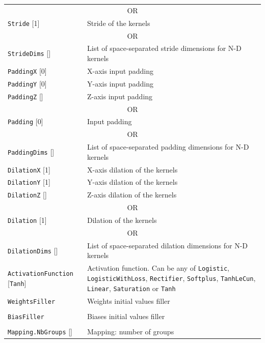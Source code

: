 \documentclass[a4paper,11pt,oneside]{article}
\begin{document}
\begin{center}
\begin{longtable}{| p{5cm} | p{10cm} | }
  \multicolumn{2}{|c|}{\cellcolor{clrgray}\tiny OR} \\
  \lstinline!Stride! [1] & Stride of the kernels \\
  \multicolumn{2}{|c|}{\cellcolor{clrgray}\tiny OR} \\
  \lstinline!StrideDims! [] & List of space-separated stride dimensions for N-D kernels \\
  \hline
  \lstinline!PaddingX! [0] & X-axis input padding \\
  \lstinline!PaddingY! [0] & Y-axis input padding \\
  \lstinline!PaddingZ! [] & Z-axis input padding \\
  \multicolumn{2}{|c|}{\cellcolor{clrgray}\tiny OR} \\
  \lstinline!Padding! [0] & Input padding \\
  \multicolumn{2}{|c|}{\cellcolor{clrgray}\tiny OR} \\
  \lstinline!PaddingDims! [] & List of space-separated padding dimensions for N-D kernels \\
  \hline
  \lstinline!DilationX! [1] & X-axis dilation of the kernels \\
  \lstinline!DilationY! [1] & Y-axis dilation of the kernels \\
  \lstinline!DilationZ! [] & Z-axis dilation of the kernels \\
  \multicolumn{2}{|c|}{\cellcolor{clrgray}\tiny OR} \\
  \lstinline!Dilation! [1] & Dilation of the kernels \\
  \multicolumn{2}{|c|}{\cellcolor{clrgray}\tiny OR} \\
  \lstinline!DilationDims! [] & List of space-separated dilation dimensions for N-D kernels \\
  \hline
  \lstinline!ActivationFunction! [\lstinline!Tanh!] & Activation function.
  Can be any of \lstinline!Logistic!,  \lstinline!LogisticWithLoss!,
  \lstinline!Rectifier!, \lstinline!Softplus!, \lstinline!TanhLeCun!,
  \lstinline!Linear!, \lstinline!Saturation! or \lstinline!Tanh! \\
  \lstinline!WeightsFiller! & Weights initial values filler \\
   & \\
  \lstinline!BiasFiller! & Biases initial values filler \\
   & \\
  \lstinline!Mapping.NbGroups! [] & Mapping: number of groups \\

\end{longtable}
\end{center}
\end{document}
